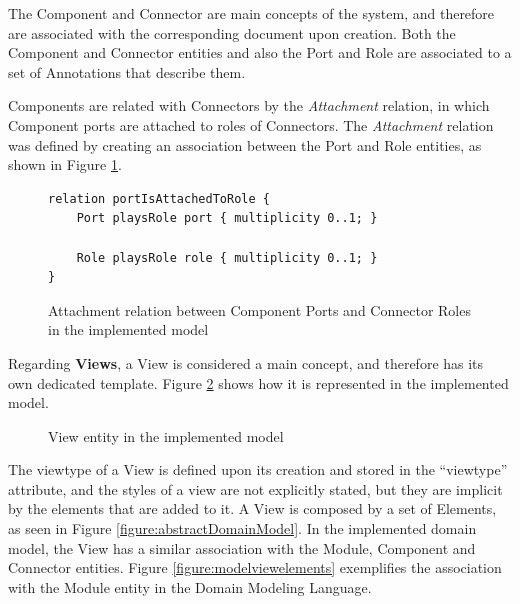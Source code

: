 \documentclass[conference]{IEEEtran}
\begin{document}
The Component and Connector are main concepts of the system, and therefore are associated with the corresponding document upon creation. Both the Component and Connector entities and also the Port and Role are associated to a set of Annotations that describe them.

Components are related with Connectors by the \textit{Attachment} relation, in which Component ports are attached to roles of Connectors. The \textit{Attachment} relation was defined by creating an association between the Port and Role entities, as shown in Figure \ref{figure:modelAttachmentRelation}.

\begin{figure}
\lstset{style=customjava}
\begin{lstlisting}
relation portIsAttachedToRole {
	Port playsRole port { multiplicity 0..1; }
	
	Role playsRole role { multiplicity 0..1; }
}
\end{lstlisting}
\caption{Attachment relation between Component Ports and Connector Roles in the implemented model}
\label{figure:modelAttachmentRelation}
\end{figure}

Regarding \textbf{Views}, a View is considered a main concept, and therefore has its own dedicated template. Figure \ref{figure:modelView} shows how it is represented in the implemented model.

\begin{figure}
\centering
\renewcommand {\umltextcolor}{black}
\renewcommand {\umlfillcolor}{none}
\renewcommand {\umldrawcolor}{black}
\caption{View entity in the implemented model}
\label{figure:modelView}
\end{figure}

The viewtype of a View is defined upon its creation and stored in the ``viewtype'' attribute, and the styles of a view are not explicitly stated, but they are implicit by the elements that are added to it. A View is composed by a set of Elements, as seen in Figure \ref{figure:abstractDomainModel}. In the implemented domain model, the View has a similar association with the Module, Component and Connector entities. Figure \ref{figure:modelviewelements} exemplifies the association with the Module entity in the Domain Modeling Language.
\end{document}

